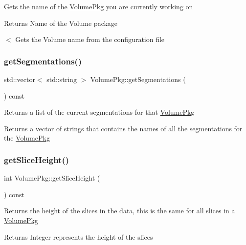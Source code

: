 Gets the name of the \hyperlink{classVolumePkg}{Volume\+Pkg} you are currently working on \begin{DoxyReturn}{Returns}
Name of the Volume package 
\end{DoxyReturn}
$<$ Gets the Volume name from the configuration file \hypertarget{classVolumePkg_a833271b79606cea077a5932ae0bd054e}{}\label{classVolumePkg_a833271b79606cea077a5932ae0bd054e} 
\subsubsection{\texorpdfstring{get\+Segmentations()}{getSegmentations()}}
{\footnotesize\ttfamily std\+::vector$<$ std\+::string $>$ Volume\+Pkg\+::get\+Segmentations (\begin{DoxyParamCaption}{ }\end{DoxyParamCaption}) const}

Returns a list of the current segmentations for that \hyperlink{classVolumePkg}{Volume\+Pkg} \begin{DoxyReturn}{Returns}
a vector of strings that contains the names of all the segmentations for the \hyperlink{classVolumePkg}{Volume\+Pkg} 
\end{DoxyReturn}
\hypertarget{classVolumePkg_a28bc3bf24aa05a6c802888a3fb862aec}{}\label{classVolumePkg_a28bc3bf24aa05a6c802888a3fb862aec} 
\subsubsection{\texorpdfstring{get\+Slice\+Height()}{getSliceHeight()}}
{\footnotesize\ttfamily int Volume\+Pkg\+::get\+Slice\+Height (\begin{DoxyParamCaption}{ }\end{DoxyParamCaption}) const}

Returns the height of the slices in the data, this is the same for all slices in a \hyperlink{classVolumePkg}{Volume\+Pkg} \begin{DoxyReturn}{Returns}
Integer represents the height of the slices 
\end{DoxyReturn}
\hypertarget{classVolumePkg_a428f50ef3408fbc8826597d1dcb35ed5}{}\label{classVolumePkg_a428f50ef3408fbc8826597d1dcb35ed5} 
